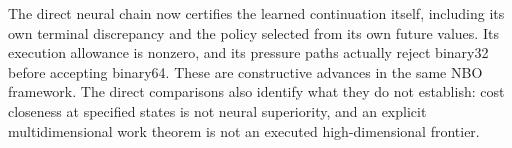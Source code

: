 \documentclass[ecta,nameyear,draft]{econsocart}
\theoremstyle{definition}
\theoremstyle{remark}
\begin{document}
The direct neural chain now certifies the learned continuation itself,
including its own terminal discrepancy and the policy selected from its own
future values. Its execution allowance is nonzero, and its pressure paths
actually reject binary32 before accepting binary64. These are constructive
advances in the same NBO framework. The direct comparisons also identify
what they do not establish: cost closeness at specified states is not neural
superiority, and an explicit multidimensional work theorem is not an
executed high-dimensional frontier.



\end{document}
